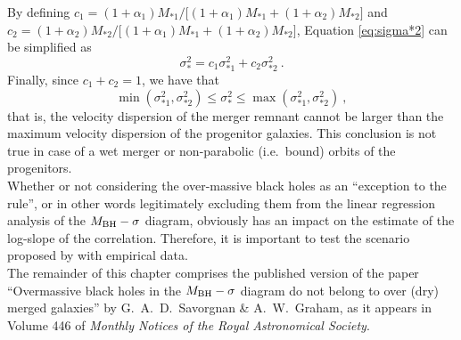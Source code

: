 By defining $c_1 = (1+\alpha_1)M_{*1}/\bigl[ (1+\alpha_1)M_{*1} + (1+\alpha_2)M_{*2} \bigr ]$ 
and $c_2 = (1+\alpha_2)M_{*2}/\bigl[ (1+\alpha_1)M_{*1} + (1+\alpha_2)M_{*2} \bigr ]$, 
Equation \ref{eq:sigma*2} can be simplified as 
\begin{equation}
\sigma_*^2 = c_1 \sigma_{*1}^2 + c_2 \sigma_{*2}^2 \ .
\end{equation}
Finally, since $c_1 + c_2 = 1$, we have that 
\begin{equation}
\min(\sigma_{*1}^2, \sigma_{*2}^2) \leq \sigma_*^2 \leq \max(\sigma_{*1}^2, \sigma_{*2}^2) \ ,
\end{equation}
that is, the velocity dispersion of the merger remnant cannot be larger 
than the maximum velocity dispersion of the progenitor galaxies. 
This conclusion is not true in case of a wet merger or non-parabolic (i.e.~bound) orbits of the progenitors. \\

Whether or not considering the over-massive black holes as an ``exception to the rule'', 
or in other words legitimately excluding them from the linear regression analysis of the $M_{\rm BH} - \sigma$ diagram, 
obviously has an impact on the estimate of the log-slope of the correlation. 
Therefore, it is important to test the scenario proposed by \citet{volontericiotti2013} 
with empirical data. \\

The remainder of this chapter comprises the published version of the paper 
``Overmassive black holes in the $M_{\rm BH} - \sigma$ diagram 
do not belong to over (dry) merged galaxies'' 
by G.~A.~D.~Savorgnan \& A.~W.~Graham,  
as it appears in Volume 446 of \emph{Monthly Notices of the Royal Astronomical Society}. 



